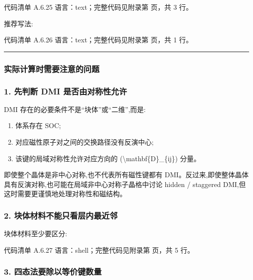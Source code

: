 \documentclass[lang=cn,scheme=chinese,color=blue,device=normal,toc=onecol,math=cm]{elegantbook}
\begin{document}
\begin{codeindexbox}{代码清单 A.6.25}
语言：text；完整代码见附录第 \pageref{code:6:25} 页，共 3 行。
\end{codeindexbox}


推荐写法:\par


\begin{codeindexbox}{代码清单 A.6.26}
语言：text；完整代码见附录第 \pageref{code:6:26} 页，共 1 行。
\end{codeindexbox}


\medskip\hrule\medskip


\subsubsection{实际计算时需要注意的问题}


\subsubsection{1. 先判断 DMI 是否由对称性允许}


DMI 存在的必要条件不是“块体”或“二维”,而是:\par


\begin{enumerate}
\item 体系存在 SOC;
\item 对应磁性原子对之间的交换路径没有反演中心;
\item 该键的局域对称性允许对应方向的 (\textbackslash{}\allowbreak{}mathbf\{D\}\_\allowbreak{}\{ij\}) 分量。
\end{enumerate}


即使整个晶体是非中心对称,也不代表所有磁性键都有 DMI。反过来,即使整体晶体具有反演对称,也可能在局域非中心对称子晶格中讨论 hidden /\allowbreak{} staggered DMI,但这时需要更谨慎地处理对称性和磁结构。\par


\subsubsection{2. 块体材料不能只看层内最近邻}


块体材料至少要区分:\par


\begin{codeindexbox}{代码清单 A.6.27}
语言：shell；完整代码见附录第 \pageref{code:6:27} 页，共 5 行。
\end{codeindexbox}


\subsubsection{3. 四态法要除以等价键数量}
\end{document}
